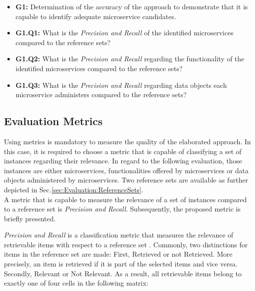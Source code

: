 \begin{itemize}
	\item \textbf{G1:} Determination of the accuracy of the approach to demonstrate that it is capable to identify adequate microservice candidates.
	\item \textbf{G1.Q1:} What is the \textit{Precision and Recall} of the identified microservices compared to the reference sets?
	\item \textbf{G1.Q2:} What is the \textit{Precision and Recall} regarding the functionality of the identified microservices compared to the reference sets?
	\item \textbf{G1.Q3:} What is the \textit{Precision and Recall} regarding data objects each microservice administers compared to the reference sets?


\end{itemize}




\subsection{Evaluation Metrics}
\label{sec:Evaluation:Metrics}

Using metrics is mandatory to measure the quality of the elaborated approach. In this case, it is required to choose a metric that is capable of classifying a set of instances regarding their relevance.
In regard to the following evaluation, those instances are either microservices, functionalities offered by microservices or data objects administered by microservices. Two reference sets are available as further depicted in Sec.\ref{sec:Evaluation:ReferenceSets}. \\
A metric that is capable to measure the relevance of a set of instances compared to a reference set is \textit{Precision and Recall}. Subsequently, the proposed metric is briefly presented.

\noindent
\textit{Precision and Recall} is a classification metric that measures the relevance of retrievable items with respect to a reference set \cite{PrecisionRecall}. Commonly, two distinctions for items in the reference set are made: First, Retrieved or not Retrieved. More precisely, an item is retrieved if it is part of the selected items and vice versa. Secondly, Relevant or Not Relevant. As a result, all retrievable items belong to exactly one of four cells in the following matrix:


